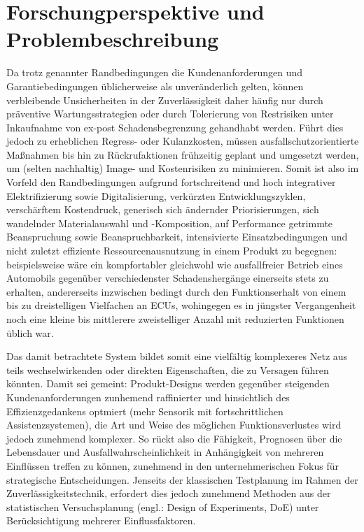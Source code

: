 \section{Forschungperspektive und Problembeschreibung}
Da trotz genannter Randbedingungen die Kundenanforderungen und Garantiebedingungen üblicherweise als unveränderlich gelten, können verbleibende Unsicherheiten in der Zuverlässigkeit daher häufig nur durch präventive Wartungsstrategien oder durch Tolerierung von Restrisiken unter Inkaufnahme von ex-post Schadensbegrenzung gehandhabt werden.
Führt dies jedoch zu erheblichen Regress- oder Kulanzkosten, müssen ausfallschutzorientierte Maßnahmen bis hin zu Rückrufaktionen frühzeitig geplant und umgesetzt werden, um (selten nachhaltig) Image- und Kostenrisiken zu minimieren.
Somit ist also im Vorfeld den Randbedingungen aufgrund fortschreitend und hoch integrativer Elektrifizierung sowie Digitalisierung, verkürzten Entwicklungszyklen, verschärftem Kostendruck, generisch sich ändernder Priorisierungen, sich wandelnder Materialauswahl und -Komposition, auf Performance getrimmte Beanspruchung sowie Beanspruchbarkeit, intensivierte Einsatzbedingungen und nicht zuletzt effiziente Ressourcenausnutzung in einem Produkt zu begegnen:
beispielsweise wäre ein kompfortabler gleichwohl wie ausfallfreier Betrieb eines Automobils gegenüber verschiedenster Schadenshergänge einerseits stets zu erhalten, andererseits inzwischen bedingt durch den Funktionserhalt von einem bis zu dreistelligen Vielfachen an ECUs, wohingegen es in jüngster Vergangenheit noch eine kleine bis mittlerere zweistelliger Anzahl mit reduzierten Funktionen üblich war.

Das damit betrachtete System bildet somit eine vielfältig komplexeres Netz aus teils wechselwirkenden oder direkten Eigenschaften, die zu Versagen führen könnten.
Damit sei gemeint: Produkt-Designs werden gegenüber steigenden Kundenanforderungen zunhemend raffinierter und hinsichtlich des Effizienzgedankens optmiert (mehr Sensorik mit fortschrittlichen Assistenzsystemen), die Art und Weise des möglichen Funktionsverlustes wird jedoch zunehmend komplexer.
So rückt also die Fähigkeit, Prognosen über die Lebensdauer und Ausfallwahrscheinlichkeit in Anhängigkeit von mehreren Einflüssen treffen zu können, zunehmend in den unternehmerischen Fokus für strategische Entscheidungen.
Jenseits der klassischen Testplanung im Rahmen der Zuverlässigkeitstechnik, erfordert dies jedoch zunehmend Methoden aus der statistischen Versuchsplanung (engl.: Design of Experiments, DoE) unter Berücksichtigung mehrerer Einflussfaktoren.


